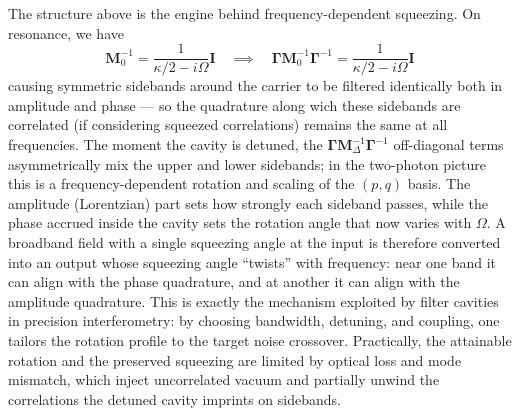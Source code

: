 The structure above is the engine behind frequency-dependent squeezing. On resonance, we have 
\begin{equation*}
\mathbf{M}_0^{-1} = \frac{1}{\kappa/2 - i\Omega} \mathbf{I} \quad \implies \quad  \mathbf{\Gamma} \mathbf{M}_0^{-1} \mathbf{\Gamma}^{-1} = \frac{1}{\kappa/2 - i\Omega} \mathbf{I}
\end{equation*}
causing symmetric sidebands around the carrier to be filtered identically both in amplitude and phase — so the quadrature along wich these sidebands are correlated (if considering squeezed correlations) remains the same at all frequencies. The moment the cavity is detuned, the $\mathbf{\Gamma}\mathbf{M}^{-1}_\Delta \mathbf{\Gamma}^{-1}$ off-diagonal terms asymmetrically mix the upper and lower sidebands; in the two-photon picture this is a frequency-dependent rotation and scaling of the $(p,q)$ basis. The amplitude (Lorentzian) part sets how strongly each sideband passes, while the phase accrued inside the cavity sets the rotation angle that now varies with $\Omega$. A broadband field with a single squeezing angle at the input is therefore converted into an output whose squeezing angle “twists” with frequency: near one band it can align with the phase quadrature, and at another it can align with the amplitude quadrature. This is exactly the mechanism exploited by filter cavities in precision interferometry: by choosing bandwidth, detuning, and coupling, one tailors the rotation profile to the target noise crossover. Practically, the attainable rotation and the preserved squeezing are limited by optical loss and mode mismatch, which inject uncorrelated vacuum and partially unwind the correlations the detuned cavity imprints on sidebands. \\



